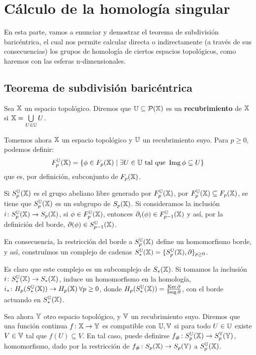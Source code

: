 \chapter{Cálculo de la homología singular}\label{ch:calculoI}

En esta parte, vamos a enunciar y demostrar el teorema de subdivisión baricéntrica,
el cual nos permite calcular directa o indirectamente (a través de sus consecuencias)
los grupos de homología de ciertos espacios topológicos, como haremos con las esferas
n-dimensionales.

\section{Teorema de subdivisión baricéntrica}

\begin{definition}
  Sea ${\mathbb X}$ un espacio topológico. Diremos que ${\mathbb U} \subseteq \mathcal P({\mathbb X})$ es un \textbf{recubrimiento} de ${\mathbb X}$ si ${\mathbb X} = \bigcup\limits_{U \in {\mathbb U}} U$.
\end{definition}

Tomemos ahora ${\mathbb X}$ un espacio topológico y ${\mathbb U}$ un recubrimiento suyo. Para $ p \geq 0$, podemos definir:
\[ F_p^{\mathbb U}({\mathbb X}) = \{\phi \in F_p({\mathbb X}) \mid \exists U \in {\mathbb U} \text{ tal que } \operatorname{Img} \phi \subseteq U\} \]
que es, por definición, subconjunto de $F_p({\mathbb X})$.

Si $S_p^{\mathbb U}({\mathbb X})$ es el grupo abeliano libre generado por $F_p^{\mathbb U}({\mathbb X})$, por $F_p^{\mathbb U}({\mathbb X}) \subseteq F_p({\mathbb X})$, se tiene
que $S_p^{\mathbb U}({\mathbb X})$ es un subgrupo de $S_p({\mathbb X})$. Si consideramos la inclusión $i \colon S_p^{\mathbb U}({\mathbb X}) \to S_p({\mathbb X})$, si
$\phi \in F_p^{\mathbb U}({\mathbb X})$, entonces $\partial_i(\phi) \in F_{p-1}^{\mathbb U}({\mathbb X})$ y así, por la definición del borde, $\partial(\phi) \in S_{p-1}^{\mathbb U}({\mathbb X})$.

En consecuencia, la restricción del borde a $S_p^{\mathbb U}({\mathbb X})$ define un homomorfismo borde, y así, construímos un complejo
de cadenas $S_*^{\mathbb U}({\mathbb X}) = \{S_p^{\mathbb U}({\mathbb X}), \partial\}_{p \geq 0}$.

Es claro que este complejo es un subcomplejo de $S_*({\mathbb X})$. Si tomamos la inclusión $i \colon S_*^{\mathbb U}({\mathbb X}) \to S_*({\mathbb X})$, induce un
homomorfismo en la homología, $i_* \colon H_p(S_*^{\mathbb U}({\mathbb X})) \to H_p({\mathbb X}) \hspace{0.2em} \forall p \geq 0$, donde
$H_p(S_*^{\mathbb U}({\mathbb X})) = \frac{\operatorname{Ker} \partial}{\operatorname{Img} \partial}$, con el borde actuando en $S_*^{\mathbb U}({\mathbb X})$.

Sea ahora ${\mathbb Y}$ otro espacio topológico, y ${\mathbb V}$ un recubrimiento suyo. Diremos que una función continua $f \colon {\mathbb X} \to {\mathbb Y}$ es compatible
con ${\mathbb U}, {\mathbb V}$ si para todo $U \in {\mathbb U}$ existe $V \in {\mathbb V}$ tal que $f(U) \subseteq V$. En tal caso, puede definirse
$f_\# \colon S_p^{\mathbb U}({\mathbb X}) \to S_p^{\mathbb V}({\mathbb Y})$, homomorfismo, dado por la restricción de $f_\# \colon S_{p}({\mathbb X}) \to S_{p}({\mathbb Y})$ a $S_p^{\mathbb U}({\mathbb X})$.

